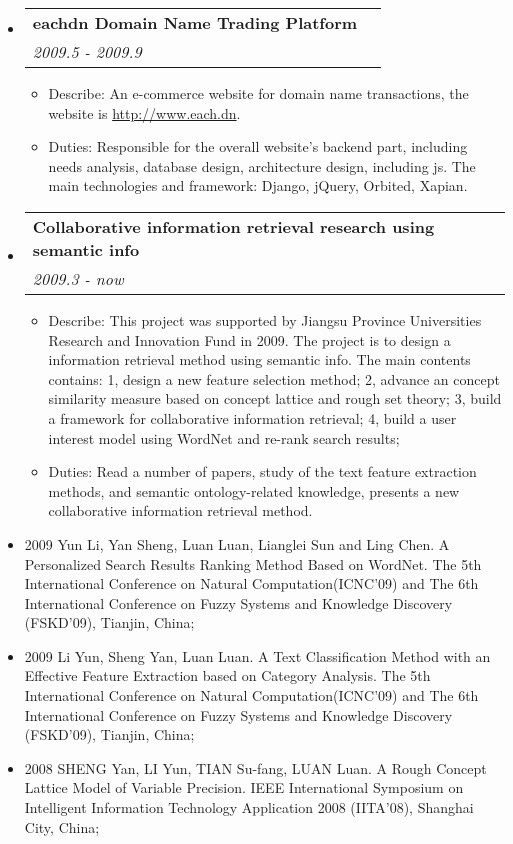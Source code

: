 \documentclass[letterpaper,11pt]{article}
\makeatletter
\newcommand{\resitem}[1]{\item #1 \vspace{-2pt}}
\newcommand{\resheading}[1]{{\large \parashade[.9]{sharpcorners}{\textbf{#1 \vphantom{p\^{E}}}}}}
\newcommand{\ressubheading}[4]{
\begin{tabular*}{6.5in}{l@{\extracolsep{\fill}}r}
        \textbf{#1} & #2 \\
        \textit{#3} & \textit{#4} \\
\end{tabular*}\vspace{-6pt}}
\makeatother
\begin{document}
\begin{CJK*}{GBK}{kai}
\begin{itemize}
\item
    \ressubheading{eachdn Domain Name Trading Platform}{}{2009.5 - 2009.9}{}
    \begin{itemize}
        \resitem{   Describe:
An e-commerce website for domain name transactions, the website is
\href{http://www.each.dn/}{http://www.each.dn}. }
        \resitem{   Duties: Responsible for the overall website's backend part,
including needs analysis, database design, architecture design,
including js. The main technologies and framework: Django, jQuery,
Orbited, Xapian.}
    \end{itemize}

\item
    \ressubheading{Collaborative information retrieval research using semantic info}{}{2009.3 - now}{}
    \begin{itemize}
        \resitem{   Describe:
This project was supported by Jiangsu Province Universities Research
and Innovation Fund in 2009. The project is to design a information
retrieval method using semantic info. The main contents contains: 1,
design a new feature selection method; 2, advance an concept
similarity measure based on concept lattice and rough set theory; 3,
build a framework for collaborative information retrieval; 4, build
a user interest model using WordNet and re-rank search results;}
        \resitem{   Duties: Read a number of papers, study of the text feature extraction methods, and semantic ontology-related knowledge, presents a new collaborative information retrieval method.}
    \end{itemize}
\end{itemize}

\resheading{Papers}
\begin{itemize}
\item{2009 }
Yun Li, Yan Sheng, Luan Luan, Lianglei Sun and Ling Chen. A
Personalized Search Results Ranking Method Based on WordNet. The 5th
International Conference on Natural Computation(ICNC'09) and The 6th
International Conference on Fuzzy Systems and  Knowledge Discovery
(FSKD'09), Tianjin, China;

\item{2009 }
Li Yun, Sheng Yan, Luan Luan. A Text Classification Method with an
Effective Feature Extraction based on Category Analysis. The 5th
International Conference on Natural Computation(ICNC'09) and The 6th
International Conference on Fuzzy Systems and Knowledge Discovery
(FSKD'09), Tianjin, China;

\item{2008 }
SHENG Yan, LI Yun, TIAN Su-fang, LUAN Luan. A Rough Concept Lattice
Model of Variable Precision. IEEE International Symposium on
Intelligent Information Technology Application 2008 (IITA'08),
Shanghai City, China;


\end{itemize}
\end{CJK*}
\end{document}
